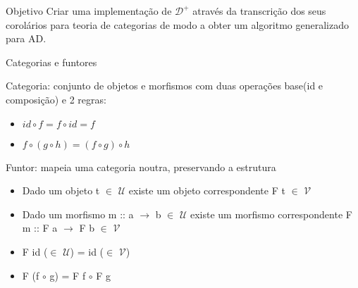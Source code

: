 \documentclass{beamer}
\theoremstyle{definition}
\theoremstyle{definition}
\theoremstyle{theorem}
\begin{document}
\begin{frame}{Objetivo}
Criar uma implementação de \ensuremath{\mathcal{D}^{+}} através da transcrição dos seus corolários para teoria de categorias
de modo a obter um algoritmo generalizado para AD.
\end{frame}






\begin{frame}{Categorias e funtores}

Categoria: conjunto de objetos e morfismos com duas operações base(id e composição) e 2 regras:
\begin{itemize}
    \item $id \circ f = f \circ id = f$
    \item $f \circ (g \circ h) = (f \circ g) \circ h$
\end{itemize}

\pause

Funtor: mapeia uma categoria noutra, preservando a estrutura
\begin{itemize}
    \item Dado um objeto t $\in$ \ensuremath{\mathcal{U}} existe um objeto correspondente F t $\in$ \ensuremath{\mathcal{V}} 
    \item  Dado um morfismo m :: a \ensuremath{\rightarrow } b $\in$ \ensuremath{\mathcal{U}} existe um morfismo correspondente F m :: F a \ensuremath{\rightarrow } F b $\in$ \ensuremath{\mathcal{V}}
    \item F id ($\in$ \ensuremath{\mathcal{U}}) = id ($\in$ \ensuremath{\mathcal{V}})
    \item F (f $\circ$ g) = F f $\circ$ F g
\end{itemize}

\end{frame}
\end{document}
